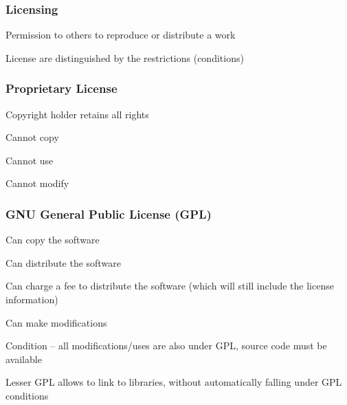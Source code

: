 \documentclass[t,12pt,numbers,fleqn]{beamer}
\begin{document}

\begin{frame}
\frametitle{Licensing}

\bi
\item Permission to others to reproduce or distribute a work
\item License are distinguished by the restrictions (conditions)
\ei

\end{frame}


\begin{frame}
\frametitle{Proprietary License}

\bi
\item Copyright holder retains all rights
\item Cannot copy
\item Cannot use
\item Cannot modify
\ei

\end{frame}


\begin{frame}
\frametitle{GNU General Public License (GPL)}

\bi
\item Can copy the software
\item Can distribute the software
\item Can charge a fee to distribute the software (which will still include the license information)
\item Can make modifications
\item Condition -- all modifications/uses are also under GPL, source
  code must be available
\item Lesser GPL allows to link to libraries, without automatically falling under
  GPL conditions
\ei

\end{frame}

\end{document}
